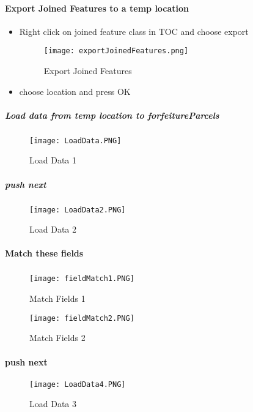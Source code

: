 \paragraph[Export Joined Features]{Export Joined Features to a temp location \texorpdfstring{\\}{}}
\begin{itemize}
\item Right click  on joined feature class in TOC and choose export
\begin{figure}[h!]
\centering
    \texttt{[image: exportJoinedFeatures.png]}
\caption{Export Joined Features}
\end{figure}
\item choose location and press OK
\end{itemize}
\clearpage
\subparagraph[Load data to forfeitureParcels]{\Large Load data from temp location to forfeitureParcels}
\subparagraph*{}
\begin{figure}[h!]
\centering
    \texttt{[image: LoadData.PNG]}
\caption{Load Data 1}
\end{figure}
\clearpage
\subparagraph*{\Large push next}
\begin{figure}[h!]
\centering
    \texttt{[image: LoadData2.PNG]}
\caption{Load Data 2}
\end{figure}
\clearpage
\paragraph[Match these fields]{\Large Match these fields}
\subparagraph*{}
\begin{figure}[h!]
\centering
    \texttt{[image: fieldMatch1.PNG]}
\caption{Match Fields 1}
\end{figure}
\begin{figure}[h!]
\centering
    \texttt{[image: fieldMatch2.PNG]}
\caption{Match Fields 2}
\end{figure}
\clearpage
\paragraph*{\Large push next}
\begin{figure}[h!]
\centering
    \texttt{[image: LoadData4.PNG]}
\caption{Load Data 3}
\end{figure}
